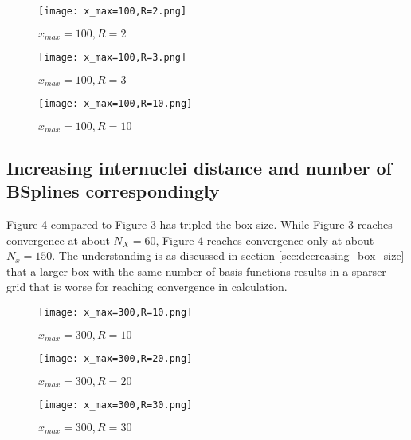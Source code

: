 \documentclass [11pt,a4paper]{report}
\begin{document}
\graphicspath{{/Users/JohnnyLin/Desktop/HumboldtProgram/HU_AMO_techincal_report/AMO_report_increasing_R/}}
\begin{figure}[H]
  \centering
  \texttt{[image: x\_max=100,R=2.png]}
  \caption{$x_{max}=100,R=2$}
  \label{x_max=100,R=2}
\end{figure}

\begin{figure}[H]
  \centering
  \texttt{[image: x\_max=100,R=3.png]}
  \caption{$x_{max}=100,R=3$}
  \label{x_max=100,R=3}
\end{figure}

\begin{figure}[H]
  \centering
  \texttt{[image: x\_max=100,R=10.png]}
  \caption{$x_{max}=100,R=10$}
  \label{x_max=100,R=10}
\end{figure}


\subsection{Increasing internuclei distance and number of BSplines correspondingly}
Figure \ref{x_max=300,R=10} compared to Figure \ref{x_max=100,R=10} has tripled the box size. While Figure \ref{x_max=100,R=10} reaches convergence at about $N_X = 60$, Figure \ref{x_max=300,R=10} reaches convergence only at about $N_x = 150$. The understanding is as discussed in section \ref{sec:decreasing_box_size} that a larger box with the same number of basis functions results in a sparser grid that is worse for reaching convergence in calculation.


\graphicspath{{/Users/JohnnyLin/Desktop/HumboldtProgram/HU_AMO_techincal_report/AMO_report_increasing_R_Nx/}}
\begin{figure}[H]
  \centering
  \texttt{[image: x\_max=300,R=10.png]}
  \caption{$x_{max}=300,R=10$}
  \label{x_max=300,R=10}
\end{figure}

\begin{figure}[H]
  \centering
  \texttt{[image: x\_max=300,R=20.png]}
  \caption{$x_{max}=300,R=20$}
  \label{x_max=300,R=20}
\end{figure}

\begin{figure}[H]
  \centering
  \texttt{[image: x\_max=300,R=30.png]}
  \caption{$x_{max}=300,R=30$}
  \label{x_max=300,R=30}
\end{figure}
\end{document}
